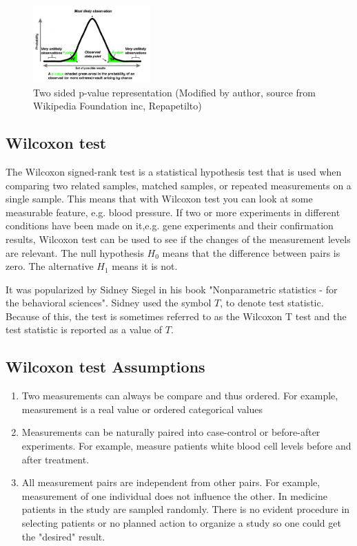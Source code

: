 \documentclass[12pt]{article}
\begin{document}
\begin{figure}[!ht]
  \centering
  \includegraphics[width=0.4\textwidth]{p_value_two_sided}
  \caption{Two sided p-value representation (Modified by author, source from Wikipedia Foundation inc, Repapetilto)}
  \label{fig:p_value_two_sided}
\end{figure}

\newpage
\subsection{Wilcoxon test}

The Wilcoxon signed-rank test is a statistical hypothesis test that is used when comparing two related samples, matched samples, or repeated measurements on a single sample. This means that with Wilcoxon test you can look at some measurable feature, e.g. blood pressure. If two or more experiments in different conditions have been made on it,e.g. gene experiments and their confirmation results, Wilcoxon test can be used to see if the changes of the measurement levels are relevant. The null hypothesis $H_0$ means that the difference between pairs is zero. The alternative $H_1$ means it is not.

It was popularized by Sidney Siegel in his book "Nonparametric statistics - for the behavioral sciences". Sidney used the symbol $T$, to denote test statistic. Because of this, the test is sometimes referred to as the Wilcoxon T test and the test statistic is reported as a value of $T$.

\newpage

\subsection{Wilcoxon test Assumptions}

\begin{enumerate}
  \item Two measurements can always be compare and thus ordered. For example, measurement is a real value or ordered categorical values
  \item Measurements can be naturally paired into case-control or before-after experiments. For example, measure patients white blood cell levels before and after treatment.
  \item All measurement pairs are independent from other pairs. For example, measurement of one individual does not influence the other. In medicine patients in the study are sampled randomly. There is no evident procedure in selecting patients or no planned action to organize a study so one could get the "desired" result.
\end{enumerate}
\end{document}

